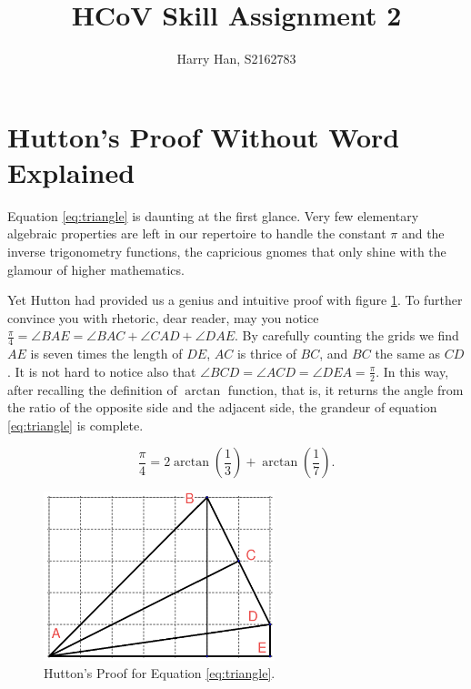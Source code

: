 \documentclass[a4paper,11pt]{article}
\title{HCoV Skill Assignment 2}
\author{Harry Han, S2162783}
\begin{document}
\maketitle


\section{Hutton's Proof Without Word Explained}


Equation \ref{eq:triangle} is daunting at the first glance.
Very few elementary algebraic properties are left in our repertoire to handle the constant $\pi$ and the inverse trigonometry functions, the capricious gnomes that only shine with the glamour of higher mathematics.

Yet Hutton had provided us a genius and intuitive proof with figure \ref{fig:Hutton's_Proof}.
To further convince you with rhetoric, dear reader, may you notice $\frac{\pi}{4} = \angle BAE = \angle BAC + \angle CAD + \angle DAE$.
By carefully counting the grids we find $AE$ is seven times the length of $DE$, $AC$ is thrice of $BC$, and $BC$ the same as $CD$.
It is not hard to notice also that $\angle BCD = \angle ACD = \angle DEA = \frac{\pi }{2}$. In this way, after recalling the definition of $\arctan$ function, that is, it returns the angle from the ratio of the opposite side and the adjacent side, the grandeur of equation \ref{eq:triangle} is complete.

\begin{equation}\label{eq:triangle}
	\dfrac{\pi}{4} = 2\arctan\left( \frac{1}{3} \right) + \arctan \left( \frac{1}{7} \right).
\end{equation}

\begin{figure}[htbp]
	\centering
	\includegraphics[width=0.6\textwidth]{./hutton.png}
	\caption{Hutton's Proof for Equation \ref{eq:triangle}.}
	\label{fig:Hutton's_Proof}
\end{figure}
\end{document}
